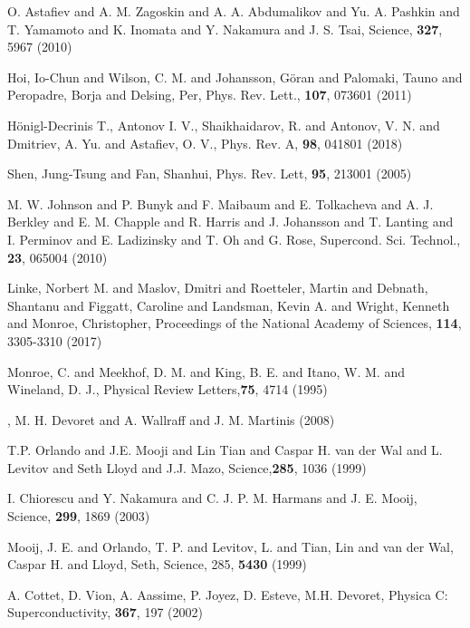 
\begin{thebibliography}{99}

O. Astafiev and A. M. Zagoskin and A. A. Abdumalikov and Yu. A. Pashkin and T. Yamamoto and K. Inomata and Y. Nakamura and J. S. Tsai, Science, \textbf{327}, 5967 (2010)

Hoi, Io-Chun and Wilson, C. M. and Johansson, G\"oran and Palomaki, Tauno and Peropadre, Borja and Delsing, Per, Phys. Rev. Lett., \textbf{107}, 073601 (2011)

H\"onigl-Decrinis T., Antonov I. V., Shaikhaidarov, R. and Antonov, V. N. and Dmitriev, A. Yu. and Astafiev, O. V., Phys. Rev. A, \textbf{98}, 041801 (2018)

Shen, Jung-Tsung and Fan, Shanhui, Phys. Rev. Lett, \textbf{95}, 213001 (2005)

{M. W. Johnson and P. Bunyk and F. Maibaum and E. Tolkacheva and A. J. Berkley and E. M. Chapple and R. Harris and J. Johansson and T. Lanting and I. Perminov and E. Ladizinsky and T. Oh and G. Rose}, {Supercond. Sci. Technol.}, \textbf{23}, {065004} (2010)
	
Linke, Norbert M. and Maslov, Dmitri and Roetteler, Martin and Debnath, Shantanu and Figgatt, Caroline and Landsman, Kevin A. and Wright, Kenneth and Monroe, Christopher, Proceedings of the National Academy of Sciences, \textbf{114}, 3305-3310 (2017)

{Monroe, C. and Meekhof, D. M. and King, B. E. and Itano, W. M. and Wineland, D. J.}, {Physical Review Letters},\textbf{75}, 4714 (1995)

, {M. H. Devoret and A. Wallraff and J. M. Martinis} (2008)

{T.P. Orlando and J.E. Mooji and Lin Tian and Caspar H. van der Wal and L. Levitov and Seth Lloyd and J.J. Mazo}, {Science},\textbf{285}, {1036} (1999)

{I. Chiorescu and Y. Nakamura and C. J. P. M. Harmans and J. E. Mooij}, {Science}, \textbf{299}, 1869 (2003)	

{Mooij, J. E. and Orlando, T. P. and Levitov, L. and Tian, Lin and van der Wal, Caspar H. and Lloyd, Seth}, {Science}, 285, \textbf{5430} (1999)
	
A. Cottet, D. Vion, A. Aassime, P. Joyez, D. Esteve, M.H. Devoret,
Physica C: Superconductivity, \textbf{367}, 197 (2002)


\end{thebibliography}
